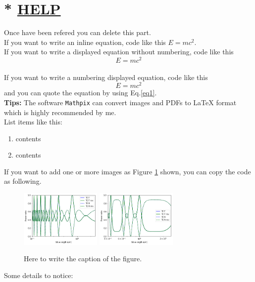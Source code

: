 \documentclass[fontsize=11pt]{scrartcl}
\begin{document}
\section*{*  \uline{HELP}}
Once have been refered you can delete this part.\\
If you want to write an inline equation, code like this $E=mc^2$.\\
If you want to write a displayed equation without numbering, code like this $$E=mc^2$$\\
If you want to write a numbering displayed equation, code like this
\begin{equation} 
    E=mc^2 \label{eq1}
\end{equation}
and you can quote the equation by using Eq.\ref {eq1}.\\
\textbf{Tips:} The software \verb|Mathpix| can convert images and PDFs to LaTeX format which is
highly recommended by me.\\
List items like this:
\begin{enumerate} %
    \item contents
    \item contents
\end{enumerate}
If you want to add one or more images as Figure \ref{name1} shown, you can copy the
code as following.\\
\begin{figure}[H]
    \centering
     \includegraphics[width=0.35\textwidth]{img/1.png} %
     \includegraphics[width=0.35\textwidth]{img/2.png}
     \caption{Here to write the caption of the figure.}
     \label{name1}
\end{figure}
{\color{ghent_blue}Some details to notice:}
\end{document}
